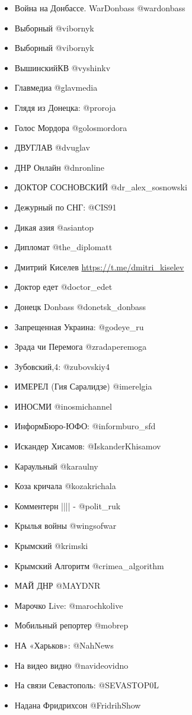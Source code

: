 \begin{itemize}
\item Война на Донбассе. WarDonbass @wardonbass
\item Выборный @vibornyk
\item Выборный @vibornyk
\item ВышинскийКВ @vyshinkv
\item Главмедиа @glavmedia
\item Глядя из Донецка: @proroja
\item Голос Мордора @golosmordora
\item ДВУГЛАВ @dvuglav
\item ДНР Онлайн @dnronline
\item ДОКТОР СОСНОВСКИЙ @dr\_alex\_sosnowski
\item Дежурный по СНГ: @CIS91
\item Дикая азия @asiantop 
\item Дипломат @the\_diplomatt
\item Дмитрий Киселев \url{https://t.me/dmitri\_kiselev}
\item Доктор едет @doctor\_edet
\item Донецк Donbass @donetsk\_donbass
\item Запрещенная Украина: @godeye\_ru
\item Зрада чи Перемога @zradaperemoga
\item Зубовский,4: @zubovskiy4
\item ИМЕРЕЛ (Гия Саралидзе) @imerelgia 
\item ИНОСМИ @inosmichannel
\item ИнформБюро-ЮФО: @informburo\_sfd
\item Искандер Хисамов: @IskanderKhisamov
\item Караульный @karaulny 
\item Коза кричала @kozakrichala
\item Комментерн |||| - @polit\_ruk
\item Крылья войны @wingsofwar
\item Крымский @krimski
\item Крымский Алгоритм @crimea\_algorithm
\item МАЙ ДНР @MAYDNR
\item Марочко Live: @marochkolive
\item Мобильный репортер @mobrep 
\item НА «Харьков»: @NahNews 
\item На видео видно @navideovidno
\item На связи Севастополь: @SEVASTOP0L
\item Надана Фридрихсон @FridrihShow 

\end{itemize}
